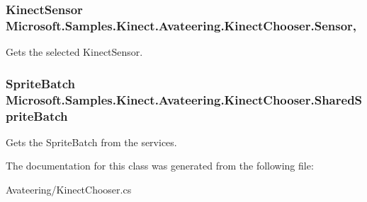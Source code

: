 \hypertarget{class_microsoft_1_1_samples_1_1_kinect_1_1_avateering_1_1_kinect_chooser_a6b75400ac959ae1dca6df7361c9d70c7}{
\subsubsection[{Sensor}]{\setlength{\rightskip}{0pt plus 5cm}Kinect\+Sensor Microsoft.\+Samples.\+Kinect.\+Avateering.\+Kinect\+Chooser.\+Sensor\hspace{0.3cm}{\ttfamily [get]}, {\ttfamily [set]}}}\label{class_microsoft_1_1_samples_1_1_kinect_1_1_avateering_1_1_kinect_chooser_a6b75400ac959ae1dca6df7361c9d70c7}


Gets the selected Kinect\+Sensor. 

\hypertarget{class_microsoft_1_1_samples_1_1_kinect_1_1_avateering_1_1_kinect_chooser_a0a11686b3a34bd60af0322f281743c49}{
\subsubsection[{Shared\+Sprite\+Batch}]{\setlength{\rightskip}{0pt plus 5cm}Sprite\+Batch Microsoft.\+Samples.\+Kinect.\+Avateering.\+Kinect\+Chooser.\+Shared\+Sprite\+Batch\hspace{0.3cm}{\ttfamily [get]}}}\label{class_microsoft_1_1_samples_1_1_kinect_1_1_avateering_1_1_kinect_chooser_a0a11686b3a34bd60af0322f281743c49}


Gets the Sprite\+Batch from the services. 



The documentation for this class was generated from the following file\+:\begin{DoxyCompactItemize}
\item 
Avateering/Kinect\+Chooser.\+cs\end{DoxyCompactItemize}
